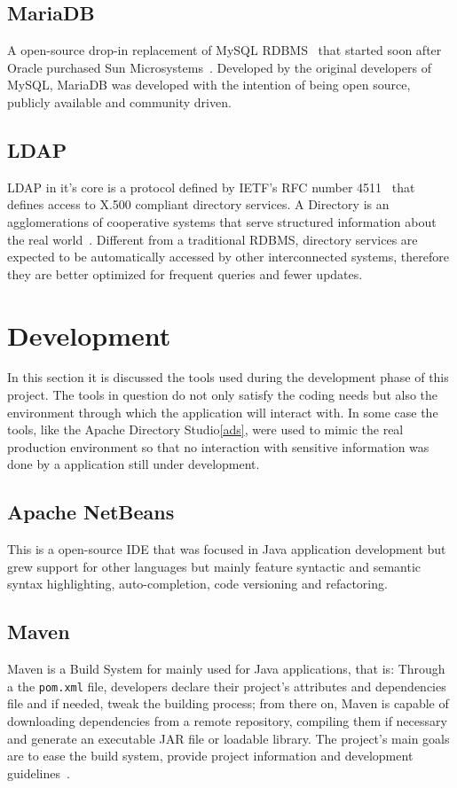 \subsection{MariaDB}
A open-source drop-in replacement of MySQL \gls{RDBMS}~\cite{mariadb} that started soon after Oracle purchased Sun Microsystems~\cite{mariadbfuture}. Developed by the original developers of MySQL, MariaDB was developed with the intention of being open source, publicly available and community driven.

\subsection{LDAP}
\gls{LDAP} in it's core is a protocol defined by \gls{IETF}'s \gls{RFC} number 4511~\cite{ldaprfc} that defines access to X.500 compliant directory services. A Directory is an agglomerations of cooperative systems that serve structured information about the real world~\cite{x500}. Different from a traditional \gls{RDBMS}, directory services are expected to be automatically accessed by other interconnected systems, therefore they are better optimized for frequent queries and fewer updates.


\section{Development}\label{development}
In this section it is discussed the tools used during the development phase of this project. The tools in question do not only satisfy the coding needs but also the environment through which the application will interact with. In some case the tools, like the Apache Directory Studio\ref{ads}, were used to mimic the real production environment so that no interaction with sensitive information was done by a application still under development.


\subsection{Apache NetBeans}\label{netbeans}
This is a open-source \gls{IDE} that was focused in Java application development but grew support for other languages but mainly feature syntactic and semantic syntax highlighting, auto-completion, code versioning and refactoring.

\subsection{Maven}
Maven is a Build System for mainly used for Java applications, that is: Through a the \texttt{pom.xml} file, developers declare their project's attributes and dependencies file and if needed, tweak the building process; from there on, Maven is capable of downloading dependencies from a remote repository, compiling them if necessary and generate an executable \gls{JAR} file or loadable library. The project's main goals are to ease the build system, provide project information and development guidelines~\cite{maven}.

